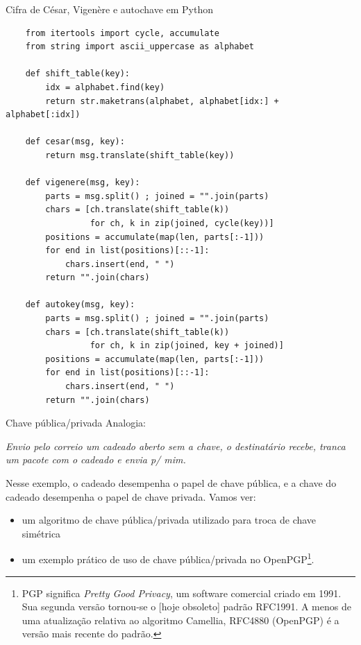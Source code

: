 \documentclass[utf8]{beamer}
\begin{document}
\begin{frame}[fragile]{Cifra de César, Vigenère e autochave em Python}
  \begin{verbatim}
    from itertools import cycle, accumulate
    from string import ascii_uppercase as alphabet

    def shift_table(key):
        idx = alphabet.find(key)
        return str.maketrans(alphabet, alphabet[idx:] + alphabet[:idx])

    def cesar(msg, key):
        return msg.translate(shift_table(key))

    def vigenere(msg, key):
        parts = msg.split() ; joined = "".join(parts)
        chars = [ch.translate(shift_table(k))
                 for ch, k in zip(joined, cycle(key))]
        positions = accumulate(map(len, parts[:-1]))
        for end in list(positions)[::-1]:
            chars.insert(end, " ")
        return "".join(chars)

    def autokey(msg, key):
        parts = msg.split() ; joined = "".join(parts)
        chars = [ch.translate(shift_table(k))
                 for ch, k in zip(joined, key + joined)]
        positions = accumulate(map(len, parts[:-1]))
        for end in list(positions)[::-1]:
            chars.insert(end, " ")
        return "".join(chars)
  \end{verbatim}
\end{frame}


\begin{frame}{Chave pública/privada}
  Analogia:
  \begin{adjustwidth}{2em}{1em}\emph{
    Envio pelo correio um cadeado aberto sem a chave,
    o destinatário recebe,
    tranca um pacote com o cadeado e envia p/ mim.
  }\end{adjustwidth}
  Nesse exemplo, o cadeado desempenha o papel de chave pública,
  e a chave do cadeado desempenha o papel de chave privada.
  \vfill
  Vamos ver:
  \begin{itemize}
    \item
    um algoritmo de chave pública/privada
    utilizado para troca de chave simétrica
    \item
    um exemplo prático de uso de chave pública/privada
    no OpenPGP\footnote{
      PGP significa \emph{Pretty Good Privacy},
      um software comercial criado em 1991.
      Sua segunda versão tornou-se o [hoje obsoleto] padrão RFC1991.
      A menos de uma atualização relativa ao algoritmo Camellia,
      RFC4880 (OpenPGP) é a versão mais recente do padrão.
    }.
  \end{itemize}
\end{frame}
\end{document}
